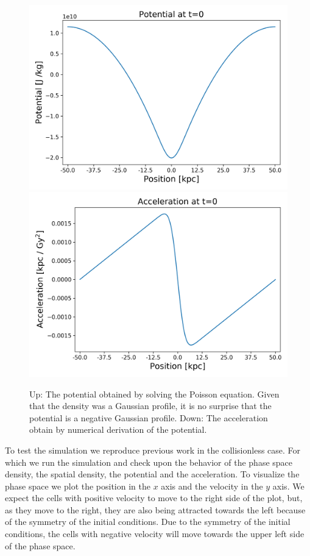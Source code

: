 \begin{figure}[h!]
    \centering
    \includegraphics[scale=0.6]{imag/1dInitPot.png}
    \includegraphics[scale=0.6]{imag/1dInitAcce.png}
    \caption{Up: The potential obtained by solving the Poisson equation. Given that the density was a Gaussian profile, it is no surprise that the potential is a negative Gaussian profile. Down: The acceleration obtain by numerical derivation of the potential.}
    \label{1dInit2}
\end{figure}

To test the simulation we reproduce previous work in the collisionless case. For which we run the simulation and check upon the behavior of the phase space density, the spatial density, the potential and the acceleration. 
To visualize the phase space we plot the position in the $x$ axis and the velocity in the $y$ axis. We expect the cells with positive velocity to move to the right side of the plot, but, as they move to the right, they are also being attracted towards the left because of the symmetry of the initial conditions. Due to the symmetry of the initial conditions, the cells with negative velocity will move towards the upper left side of the phase space. 

